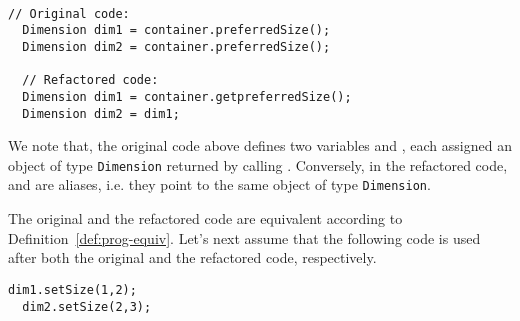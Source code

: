 \documentclass[sigconf,review,anonymous]{acmart}
\begin{document}

\begin{example}\label{ex:aliasing}
~\begin{lstlisting}[mathescape=true,showstringspaces=false]
  // Original code:
  Dimension dim1 = container.preferredSize();
  Dimension dim2 = container.preferredSize();    

  // Refactored code:
  Dimension dim1 = container.getpreferredSize();  
  Dimension dim2 = dim1;
\end{lstlisting}



    




We note that, the original code above defines two variables  and
, each assigned an object of type \texttt{Dimension} returned by calling
.
Conversely, in the refactored code,  and  are aliases, i.e. they point to the same
object of type \texttt{Dimension}.

The original and the refactored code are equivalent according to Definition~\ref{def:prog-equiv}.
Let's next assume that the following code
is used after both the original and the refactored code, respectively.

\begin{lstlisting}[mathescape=true,showstringspaces=false]
  dim1.setSize(1,2);
  dim2.setSize(2,3);  
\end{lstlisting}


\end{example}
\end{document}
